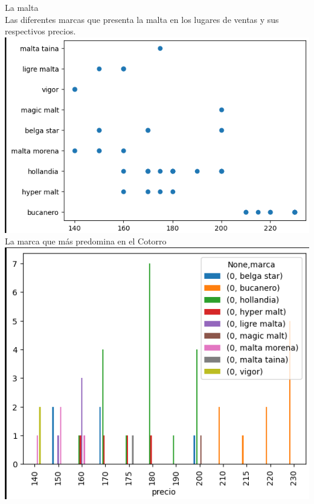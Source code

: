 \documentclass{report}
\begin{document}
    \newpage
    \centering
    {\Huge La malta}\\
    \vspace{1cm}
    Las diferentes marcas que presenta la malta en los lugares de ventas y sus respectivos precios.\\
    \vspace{1cm}
    \includegraphics[width= 1.0\textwidth]{malta}\\
    
    \newpage
    La marca que más predomina en el Cotorro\\
    \vspace{1cm}
    \includegraphics[width= 1.0\textwidth]{m-p}\\
\end{document}

